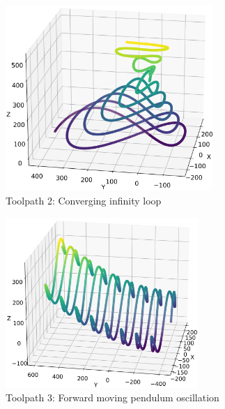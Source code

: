 \begin{figure}[H]%
	\centering
	\includegraphics[width=0.7\textwidth]{figures/path2.png}
	\caption{Toolpath 2: Converging infinity loop}
	\label{path2}
\end{figure}
\newpage




\begin{figure}[H]%
	\centering
	\includegraphics[width=0.65\textwidth]{figures/path3.png}
	\caption{Toolpath 3: Forward moving pendulum oscillation}
	\label{path3}
\end{figure}







